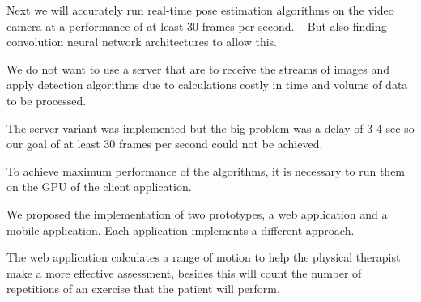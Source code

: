 Next we will accurately run real-time pose estimation algorithms on the video camera at a performance of at least 30 frames per second.
  But also finding convolution neural network architectures to allow this.

We do not want to use a server that are to receive the streams of images 
and apply detection algorithms due to calculations costly in time and volume of data to be processed.

The server variant was implemented but the big problem 
was a delay of 3-4 sec so our goal of at least 30 frames per second could not be achieved.


To achieve maximum performance of the algorithms, 
it is necessary to run them on the GPU of the client application. 

 We proposed the implementation of two prototypes, a web application and a mobile application.
Each application implements a different approach.

The web application calculates a range of motion to help the physical therapist make a more effective assessment, 
besides this will count the number of repetitions of an exercise that the patient will perform.



